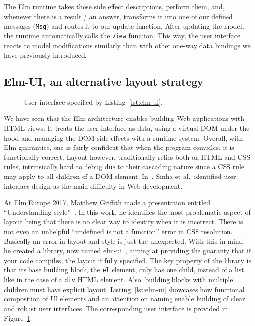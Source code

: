 The Elm runtime takes those side effect descriptions,
perform them, and, whenever there is a result / an answer,
transforms it into one of our defined messages (\verb|Msg|)
and routes it to our update function.
After updating the model, the runtime automatically calls the \verb|view| function.
This way, the user interface reacts to model modifications
similarly than with other one-way data bindings we have previously introduced.


\subsection{Elm-UI, an alternative layout strategy}%
\label{sub:elm_ui_an_alternative_layout_strategy}

\begin{figure}[ht]
	\centering
	\setlength{\fboxsep}{0pt}
	\caption{User interface specified by Listing~\ref{lst:elm-ui}.}%
	\label{fig:elm-ui}
\end{figure}

We have seen that the Elm architecture enables building Web applications with HTML views.
It treats the user interface as data, using a virtual DOM under the hood
and managing the DOM side effects with a runtime system.
Overall, with Elm guaranties, one is fairly confident that when
the program compiles, it is functionally correct.
Layout however, traditionally relies both on HTML and CSS rules,
intrinsically hard to debug due to their cascading nature
since a CSS rule may apply to all children of a DOM element.
In~\cite{sinha2015simplifying}, Sinha et al.\ identified user interface design
as the main difficulty in Web development.

At Elm Europe 2017, Matthew Griffith made a presentation
entitled ``Understanding style''~\cite{griffithstyle}.
In this work, he identifies the most problematic aspect of layout being
that there is no clear way to identify when it is incorrect.
There is not even an unhelpful ``undefined is not a function'' error in CSS resolution.
Basically an error in layout and style is just the unexpected.
With this in mind he created a library, now named elm-ui~\cite{griffithelmui},
aiming at providing the guaranty that if your code compiles,
the layout if fully specified.
The key property of the library is that its base building block,
the \verb|el| element, only has one child,
instead of a list like in the case of a \verb|div| HTML element.
Also, building blocks with multiple children must have explicit layout.
Listing~\ref{lst:elm-ui} showcases how functional composition of UI elements
and an attention on naming enable building of clear and robust user interfaces.
The corresponding user interface is provided in Figure~\ref{fig:elm-ui}.

